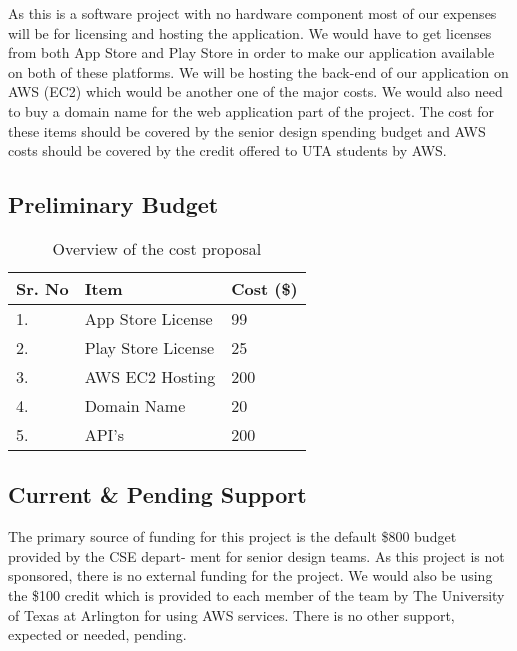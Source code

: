 As this is a software project with no hardware component most of our expenses will be for licensing and hosting the application. We would have to get licenses from both App Store and Play Store in order to make our application available on both of these platforms. We will be hosting the back-end of our application on AWS (EC2) which would be another one of the major costs. We would also need to buy a domain name for the web application part of the project. The cost for these items should be covered by the senior design spending budget and AWS costs should be covered by the credit offered to UTA students by AWS. 
 

\subsection{Preliminary Budget}
\begin{table}[h]
\centering

\begin{tabular}{|l|l|l|} 
\hline
Sr. No & Item               & Cost (\$)  \\ 
\hline
1.     & App Store License  & 99         \\ 
\hline
2.     & Play Store License & 25         \\ 
\hline
3.     & AWS EC2 Hosting    & 200        \\ 
\hline
4.     & Domain Name        & 20         \\ 
\hline
5.     & API's              & 200        \\
\hline
\end{tabular}\caption{Overview of the cost proposal}
\end{table}

\subsection{Current \& Pending Support}
The primary source of funding for this project is the default \$800 budget provided by the CSE depart-
ment for senior design teams. As this project is not sponsored, there is no external funding for the
project. We would also be using the \$100 credit which is provided to each member of the team by The University of Texas at Arlington for using AWS services. There is no other support, expected or needed, pending.